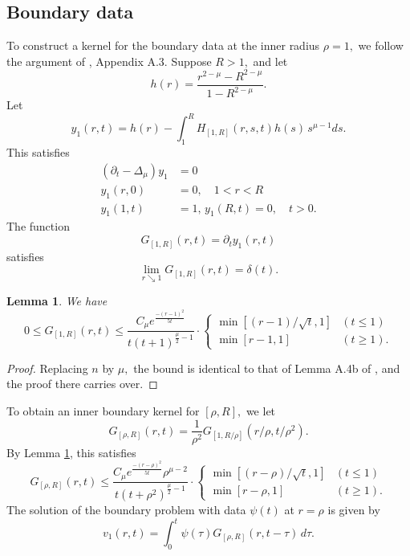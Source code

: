 \documentclass[12pt]{amsart}
\newcommand{\LB}{\left[}
\newcommand{\RB}{\right]}
\newtheorem{lemma}[thm]{Lemma}
\theoremstyle{others}
\numberwithin{equation}{section}
\newcommand{\p}{\partial}
\begin{document}

\subsection{Boundary data}\label{app:innerkernel} To construct a kernel for the boundary data at the inner radius $\rho = 1,$ we follow the argument of \cite{lte}, Appendix A.3. Suppose $R > 1,$ and let
$$h(r)  = \frac{r^{2 - \mu} - R^{2 - \mu} }{1 - R^{2 - \mu} }.$$
Let
$$y_1(r,t) = h(r) - \int_1^R H_{\LB 1, R \RB}(r,s,t) h(s) \, s^{\mu - 1} ds.$$
This satisfies
\begin{equation*}
\begin{split}
(\p_t - \Delta_\mu) y_1 & = 0 \\
y_1(r,0) & = 0, \quad 1 < r < R \\
y_1(1,t) & = 1, \,  y_1(R,t) = 0, \quad t > 0.
\end{split}
\end{equation*}
The function
$$G_{\LB 1, R\RB}(r,t) = \p_t y_1(r,t)$$
satisfies
$$\lim_{r \searrow 1} G_{\LB 1, R\RB}(r,t) = \delta(t).$$
\begin{lemma}\label{boundarykernel}
We have
\begin{equation*}
0 \leq G_{\LB 1, R\RB}(r,t) \leq \frac{C_{\mu} e^{\frac{-(r -1)^2}{5t} }}{t(t + 1)^{\frac{\mu}{2} - 1}} \cdot \begin{cases} \min \LB (r-1)/\sqrt{t}, 1 \RB & (t \leq 1) \\
\min \LB r - 1, 1 \RB & (t \geq 1). \end{cases}
\end{equation*}
\end{lemma}
\begin{proof} Replacing $n$ by $\mu,$ the bound is identical to that of Lemma A.4b of \cite{lte}, and the proof there carries over. 
\end{proof}

To obtain an inner boundary kernel for $\LB \rho, R \RB,$ we let
$$G_{\LB \rho, R \RB}(r,t) = \frac{1}{\rho^{2}} G_{\LB 1, R/\rho\RB}(r/\rho,t/\rho^2).$$
By Lemma \ref{boundarykernel}, this satisfies
\begin{equation}\label{Gbound}
G_{\LB \rho, R \RB}(r,t) \leq \frac{C_{\mu} e^{\frac{-(r -\rho)^2}{5t} } \rho^{\mu - 2} }{t(t + \rho^2 )^{\frac{\mu}{2} - 1}} \cdot \begin{cases} \min \LB (r-\rho)/\sqrt{t}, 1 \RB & (t \leq 1) \\
\min \LB r - \rho, 1 \RB & (t \geq 1). \end{cases}
\end{equation}
The solution of the boundary problem with data $\psi(t)$ at $r = \rho$ is given by
\begin{equation}\label{boundaryivp}
v_1(r,t) = \int_0^t \psi(\tau) G_{\LB \rho, R \RB}(r,t - \tau) \, d\tau.
\end{equation}
\end{document}
